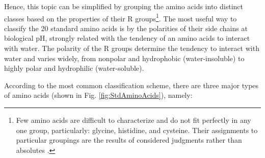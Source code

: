Hence, this topic can be simplified by grouping the amino acids into distinct classes based on the properties of their R groups\footnote{Few amino acids are difficult to characterize and do not fit perfectly in any one group, particularly: glycine, histidine, and cysteine. Their assignments to particular groupings are the results of considered judgments rather than absolutes
\cite{nelson2008lehninger}.}. The most useful way to classify the 20 standard amino acids is by the polarities of their side chains at biological pH, strongly related with the tendency of an amino acids to interact with water. The polarity of the R groups determine the tendency to interact with water and varies widely, from nonpolar and hydrophobic (water-insoluble) to highly polar and hydrophilic (water-soluble).

According to the most common classification scheme, there are three major types of amino acids (shown in Fig. \ref{fig:StdAminoAcids}), namely: %

